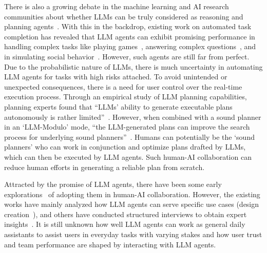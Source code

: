 There is also a growing debate in the machine learning and AI research communities about whether LLMs can be truly considered as reasoning and planning agents~\cite{kambhampati2024llms}. With this in the backdrop, existing work on automated task completion has revealed that LLM agents can exhibit promising performance in handling complex tasks like playing games~\cite{wang2023describe}, answering complex questions~\cite{zhuang2024toolqa}, and in simulating social behavior~\cite{park2023generative}. 
However, such agents are still far from perfect. Due to the probabilistic nature of LLMs, there is much uncertainty in automating LLM agents for tasks with high risks attached. %
To avoid unintended or unexpected consequences, %
there is a need for user control over the real-time execution process. %
{Through an empirical study of LLM planning capabilities, planning experts found that ``LLMs’ ability to generate executable plans autonomously is rather limited''~\cite{valmeekam2023planning}. 
However, when combined with a sound planner in an `LLM-Modulo' mode, ``the LLM-generated plans can improve the search process for underlying sound planners''~\cite{valmeekam2023planning}. 
Humans can potentially be the `sound planners' who can work in conjunction and optimize plans drafted by LLMs, which can then be executed by LLM agents. %
Such human-AI collaboration can reduce human efforts in generating a reliable plan from scratch. 
} 

Attracted by the promise of LLM agents, there have been some early explorations~\cite{geissler2024concept} of adopting them in human-AI collaboration. 
However, the existing works have mainly analyzed how LLM agents can serve specific use cases (\eg design creation~\cite{geissler2024concept}), and others have conducted structured interviews to obtain expert insights~\cite{zhang2024s,zheng2023synergizing}. 
It is still unknown how well LLM agents can work as general daily assistants to assist users in everyday tasks with varying stakes and how user trust and team performance are shaped by interacting with LLM agents. %

